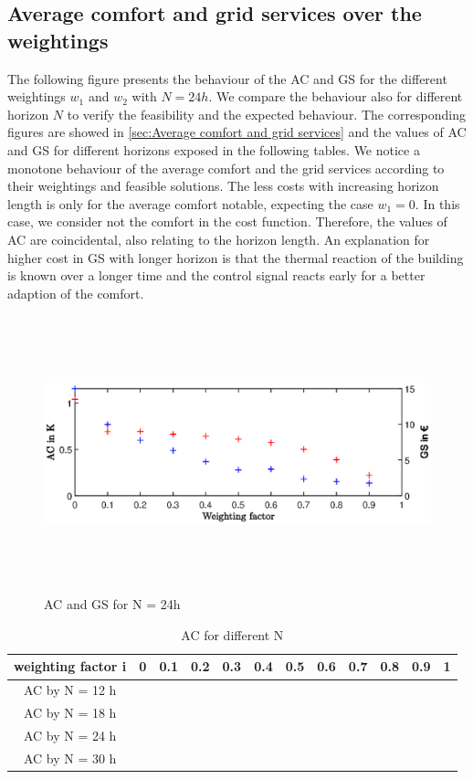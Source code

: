 \subsection{Average comfort and grid services over the weightings}
\label{subsec:Average comfort and grid services over the weightings}
The following figure presents the behaviour of the AC and GS for the different weightings $w_\text{1}$ and $w_\text{2}$ with $N = 24h$. We compare the behaviour also for different horizon $N$ to verify the feasibility and the expected behaviour. The corresponding figures are showed in \autoref{sec:Average comfort and grid services} and the values of AC and GS for different horizons exposed in the following tables.\newline
We notice a monotone behaviour of the average comfort and the grid services according to their weightings and feasible solutions. The less costs with increasing horizon length is only for the average comfort notable, expecting the case $w_\text{1}=0$. In this case, we consider not the comfort in the cost function. Therefore, the values of AC are coincidental, also relating to the horizon length.\newline
An explanation for higher cost in GS with longer horizon is that the thermal reaction of the building is known over a longer time and the control signal reacts early for a better adaption of the comfort.
    \begin{figure}[h]
            \centering
            \includegraphics[width=15cm,height=8cm]{figure/AC_und_GS_24h.eps}
           \caption{AC and GS for N = 24h}
            \label{fig:AC_und_GS_24h}
    \end{figure}
    
    \begin{table}[h]
    \centering
    \begin{tabular}{c|c|c|c|c|c|c|c|c|c|c|c}
         weighting factor i&0&0.1&0.2&0.3&0.4&0.5&0.6&0.7&0.8&0.9&1  \\
         \hline
         AC by N = 12 h&\\
         AC by N = 18 h&\\
         AC by N = 24 h&\\
         AC by N = 30 h&\\
    \end{tabular}
    \caption{AC for different N}
    \label{tab:AC for different N}
    \end{table}
    
